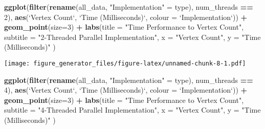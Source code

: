 \documentclass[]{article}
\newenvironment{Shaded}{\begin{snugshade}}{\end{snugshade}}
\newcommand{\KeywordTok}[1]{\textcolor[rgb]{0.13,0.29,0.53}{\textbf{#1}}}
\newcommand{\DataTypeTok}[1]{\textcolor[rgb]{0.13,0.29,0.53}{#1}}
\newcommand{\DecValTok}[1]{\textcolor[rgb]{0.00,0.00,0.81}{#1}}
\newcommand{\StringTok}[1]{\textcolor[rgb]{0.31,0.60,0.02}{#1}}
\newcommand{\OperatorTok}[1]{\textcolor[rgb]{0.81,0.36,0.00}{\textbf{#1}}}
\newcommand{\NormalTok}[1]{#1}
\begin{document}
\begin{Shaded}
\begin{Highlighting}[]
\KeywordTok{ggplot}\NormalTok{(}\KeywordTok{filter}\NormalTok{(}\KeywordTok{rename}\NormalTok{(all_data, }\StringTok{"Implementation"}\NormalTok{ =}\StringTok{ }\NormalTok{type), num_threads }\OperatorTok{==}\StringTok{ }\DecValTok{2}\NormalTok{), }
              \KeywordTok{aes}\NormalTok{(}\StringTok{`}\DataTypeTok{Vertex Count}\StringTok{`}\NormalTok{, }\StringTok{`}\DataTypeTok{Time (Milliseconds)}\StringTok{`}\NormalTok{, }\DataTypeTok{colour =} \StringTok{`}\DataTypeTok{Implementation}\StringTok{`}\NormalTok{)) }\OperatorTok{+}\StringTok{ }
\StringTok{  }\KeywordTok{geom_point}\NormalTok{(}\DataTypeTok{size=}\DecValTok{3}\NormalTok{) }\OperatorTok{+}
\StringTok{  }\KeywordTok{labs}\NormalTok{(}\DataTypeTok{title =} \StringTok{"Time Performance to Vertex Count"}\NormalTok{,}
         \DataTypeTok{subtitle =} \StringTok{"2-Threaded Parallel Implementation"}\NormalTok{,}
         \DataTypeTok{x =} \StringTok{"Vertex Count"}\NormalTok{,}
         \DataTypeTok{y =} \StringTok{"Time (Milliseconds)"}
\NormalTok{        ) }
\end{Highlighting}
\end{Shaded}

\texttt{[image: figure\_generator\_files/figure-latex/unnamed-chunk-8-1.pdf]}

\begin{Shaded}
\begin{Highlighting}[]
\KeywordTok{ggplot}\NormalTok{(}\KeywordTok{filter}\NormalTok{(}\KeywordTok{rename}\NormalTok{(all_data, }\StringTok{"Implementation"}\NormalTok{ =}\StringTok{ }\NormalTok{type), num_threads }\OperatorTok{==}\StringTok{ }\DecValTok{4}\NormalTok{), }
              \KeywordTok{aes}\NormalTok{(}\StringTok{`}\DataTypeTok{Vertex Count}\StringTok{`}\NormalTok{, }\StringTok{`}\DataTypeTok{Time (Milliseconds)}\StringTok{`}\NormalTok{, }\DataTypeTok{colour =} \StringTok{`}\DataTypeTok{Implementation}\StringTok{`}\NormalTok{)) }\OperatorTok{+}\StringTok{ }
\StringTok{  }\KeywordTok{geom_point}\NormalTok{(}\DataTypeTok{size=}\DecValTok{3}\NormalTok{) }\OperatorTok{+}
\StringTok{  }\KeywordTok{labs}\NormalTok{(}\DataTypeTok{title =} \StringTok{"Time Performance to Vertex Count"}\NormalTok{,}
         \DataTypeTok{subtitle =} \StringTok{"4-Threaded Parallel Implementation"}\NormalTok{,}
         \DataTypeTok{x =} \StringTok{"Vertex Count"}\NormalTok{,}
         \DataTypeTok{y =} \StringTok{"Time (Milliseconds)"}
\NormalTok{        ) }
\end{Highlighting}
\end{Shaded}
\end{document}
